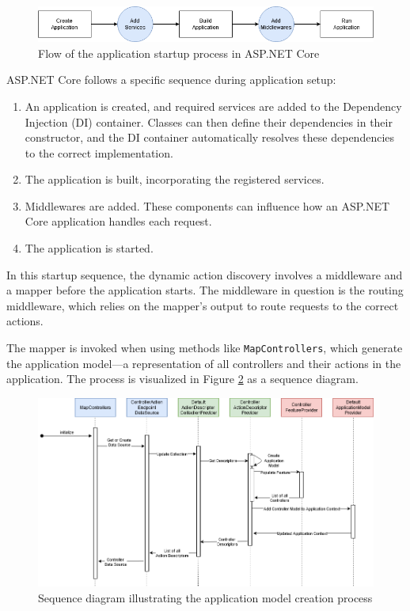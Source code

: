 \begin{figure}[H]
\centering
\includegraphics[width=1\textwidth]{graphics/startup-phase.png}
\caption{Flow of the application startup process in ASP.NET Core}
\label{fig:startup-phase}
\end{figure}

ASP.NET Core follows a specific sequence during application setup:

\begin{enumerate}
    \item An application is created, and required services are added to the Dependency Injection (DI) container. Classes can then define their dependencies in their constructor, and the DI container automatically resolves these dependencies to the correct implementation.
    \item The application is built, incorporating the registered services.
    \item Middlewares are added. These components can influence how an ASP.NET Core application handles each request.
    \item The application is started.
\end{enumerate}

In this startup sequence, the dynamic action discovery involves a middleware and a mapper before the application starts. The middleware in question is the routing middleware, which relies on the mapper's output to route requests to the correct actions.

The mapper is invoked when using methods like \texttt{MapControllers}, which generate the application model—a representation of all controllers and their actions in the application. The process is visualized in Figure \ref{fig:sequence-diagram} as a sequence diagram.

\begin{figure}[H]
\centering
\includegraphics[width=1\textwidth]{graphics/Sequence Diagram.drawio.png}
\caption{Sequence diagram illustrating the application model creation process}
\label{fig:sequence-diagram}
\end{figure}

